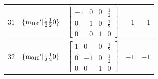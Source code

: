 \documentclass[fleqn,8pt]{jsarticle}
\begin{document}
\begin{longtable}{ccccc}
$ 31 $ & $ \{{\rm m}_{100}{}'|\frac{1}{2} \frac{1}{2} 0\} $ & $ \begin{bmatrix} -1 & 0 & 0 & \frac{1}{2} \\ 0 & 1 & 0 & \frac{1}{2} \\ 0 & 0 & 1 & 0 \end{bmatrix} $ & $ -1 $ & $ -1 $ \\ \hline
$ 32 $ & $ \{{\rm m}_{010}{}'|\frac{1}{2} \frac{1}{2} 0\} $ & $ \begin{bmatrix} 1 & 0 & 0 & \frac{1}{2} \\ 0 & -1 & 0 & \frac{1}{2} \\ 0 & 0 & 1 & 0 \end{bmatrix} $ & $ -1 $ & $ -1 $ \\
\end{longtable}
\end{document}
